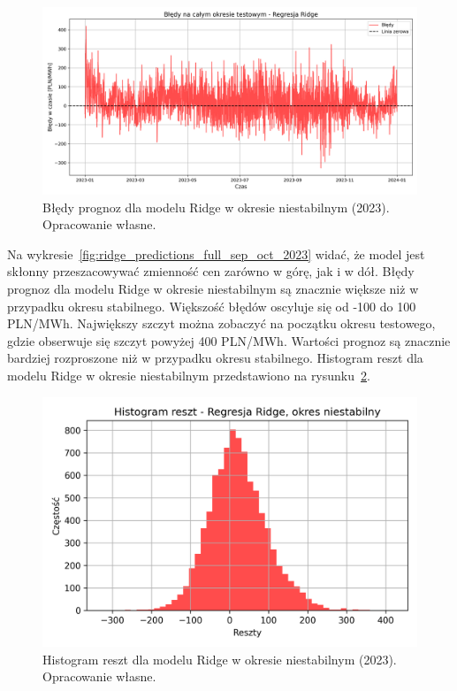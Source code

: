 \begin{figure}[H]
    \centering
    \includegraphics[width=1.0\textwidth]{../../plots/predicts/errors_over_time_Ridge_non_stable_period.png}
    \caption{Błędy prognoz dla modelu Ridge w okresie niestabilnym (2023). Opracowanie własne.}
    \label{fig:ridge_errors_full_sep_oct_2023}
\end{figure}

Na wykresie~\ref{fig:ridge_predictions_full_sep_oct_2023} widać, że model jest skłonny przeszacowywać zmienność cen zarówno w górę, jak i w dół. Błędy prognoz dla modelu Ridge w okresie niestabilnym są znacznie większe niż w przypadku okresu stabilnego. Większość błędów oscyluje się od -100 do 100 PLN/MWh. Największy szczyt można zobaczyć na początku okresu testowego, gdzie obserwuje się szczyt powyżej 400 PLN/MWh. Wartości prognoz są znacznie bardziej rozproszone niż w przypadku okresu stabilnego. Histogram reszt dla modelu Ridge w okresie niestabilnym przedstawiono na rysunku~\ref{fig:residuals_nonstable_histogram_ridge}.

\begin{figure}[H]
    \centering
    \includegraphics[width=1.0\textwidth]{../../plots/predicts/residuals_histogram_Ridge_not_stable_period.png}
    \caption{Histogram reszt dla modelu Ridge w okresie niestabilnym (2023). Opracowanie własne.}
    \label{fig:residuals_nonstable_histogram_ridge}
\end{figure}

